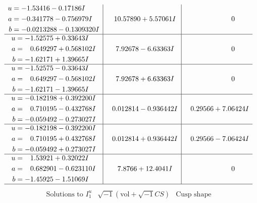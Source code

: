 \documentclass[1p]{elsarticle_modified}
\theoremstyle{definition}
\newcommand{\I}{\sqrt{-1}}
\begin{document}
$$\begin{array}{c|c|c}
\begin{aligned}
u &= -1.53416 - 0.17186 I \\
a &= -0.341778 - 0.756979 I \\
b &= -0.0213288 - 0.1309320 I\end{aligned}
 & \phantom{-}10.57890 + 5.57061 I & \phantom{-0.000000 } 0 \\ \hline\begin{aligned}
u &= -1.52575 + 0.33643 I \\
a &= \phantom{-}0.649297 + 0.568102 I \\
b &= -1.62171 + 1.39665 I\end{aligned}
 & \phantom{-}7.92678 - 6.63363 I & \phantom{-0.000000 } 0 \\ \hline\begin{aligned}
u &= -1.52575 - 0.33643 I \\
a &= \phantom{-}0.649297 - 0.568102 I \\
b &= -1.62171 - 1.39665 I\end{aligned}
 & \phantom{-}7.92678 + 6.63363 I & \phantom{-0.000000 } 0 \\ \hline\begin{aligned}
u &= -0.182198 + 0.392200 I \\
a &= \phantom{-}0.710195 - 0.432768 I \\
b &= -0.059492 - 0.273027 I\end{aligned}
 & \phantom{-}0.012814 - 0.936442 I & \phantom{-}0.29566 + 7.06424 I \\ \hline\begin{aligned}
u &= -0.182198 - 0.392200 I \\
a &= \phantom{-}0.710195 + 0.432768 I \\
b &= -0.059492 + 0.273027 I\end{aligned}
 & \phantom{-}0.012814 + 0.936442 I & \phantom{-}0.29566 - 7.06424 I \\ \hline\begin{aligned}
u &= \phantom{-}1.53921 + 0.32022 I \\
a &= \phantom{-}0.682901 - 0.623110 I \\
b &= -1.45925 - 1.51069 I\end{aligned}
 & \phantom{-}7.8766 + 12.4041 I & \phantom{-0.000000 } 0\\
 \hline 
 \end{array}$$\newpage$$\begin{array}{c|c|c}  
\text{Solutions to }I^u_{1}& \I (\text{vol} + \sqrt{-1}CS) & \text{Cusp shape}\\
 \hline 
\begin{aligned}

\end{aligned}
\end{array}$$
\end{document}
